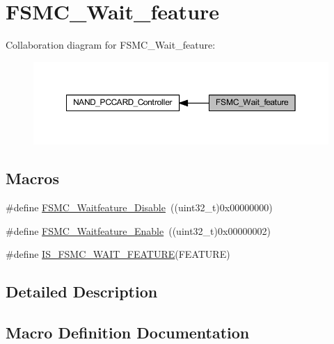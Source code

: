 \hypertarget{group___f_s_m_c___wait__feature}{}\section{F\+S\+M\+C\+\_\+\+Wait\+\_\+feature}
\label{group___f_s_m_c___wait__feature}
Collaboration diagram for F\+S\+M\+C\+\_\+\+Wait\+\_\+feature\+:
\nopagebreak
\begin{figure}[H]
\begin{center}
\leavevmode
\includegraphics[width=350pt]{group___f_s_m_c___wait__feature}
\end{center}
\end{figure}
\subsection*{Macros}
\begin{DoxyCompactItemize}
\item 
\#define \hyperlink{group___f_s_m_c___wait__feature_ga8a31f05576e66546fbbcdb06ff67da7d}{F\+S\+M\+C\+\_\+\+Waitfeature\+\_\+\+Disable}~((uint32\+\_\+t)0x00000000)
\item 
\#define \hyperlink{group___f_s_m_c___wait__feature_ga3113366130dfbf6d116f1afb94af1726}{F\+S\+M\+C\+\_\+\+Waitfeature\+\_\+\+Enable}~((uint32\+\_\+t)0x00000002)
\item 
\#define \hyperlink{group___f_s_m_c___wait__feature_ga07c2585b517df2c7afbe3ba16c22f236}{I\+S\+\_\+\+F\+S\+M\+C\+\_\+\+W\+A\+I\+T\+\_\+\+F\+E\+A\+T\+U\+RE}(F\+E\+A\+T\+U\+RE)
\end{DoxyCompactItemize}


\subsection{Detailed Description}


\subsection{Macro Definition Documentation}
\mbox{\label{group___f_s_m_c___wait__feature_ga8a31f05576e66546fbbcdb06ff67da7d}} 
